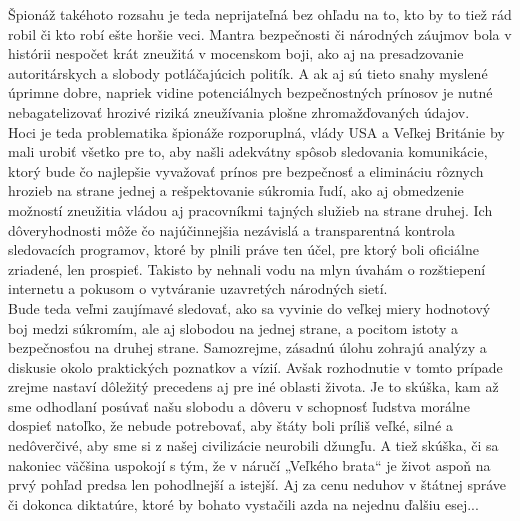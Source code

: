 \documentclass{article}
\begin{document}
\begin{flushleft}
Špionáž takéhoto rozsahu je teda neprijateľná bez ohľadu na to, kto by to tiež rád robil či kto robí ešte horšie veci. Mantra bezpečnosti či národných záujmov bola v histórii nespočet krát zneužitá v mocenskom boji, ako aj na presadzovanie autoritárskych a slobody potláčajúcich politík. A ak aj sú tieto snahy myslené úprimne dobre, napriek vidine potenciálnych bezpečnostných prínosov je nutné nebagatelizovať hrozivé riziká zneužívania plošne zhromažďovaných údajov.\\
Hoci je teda problematika špionáže rozporuplná, vlády USA a Veľkej Británie by mali urobiť všetko pre to, aby našli adekvátny spôsob sledovania komunikácie, ktorý bude čo najlepšie vyvažovať prínos pre bezpečnosť a elimináciu rôznych hrozieb na strane jednej a rešpektovanie súkromia ľudí, ako aj obmedzenie možností zneužitia vládou aj pracovníkmi tajných služieb na strane druhej. Ich dôveryhodnosti môže čo najúčinnejšia nezávislá a transparentná kontrola sledovacích programov, ktoré by plnili práve ten účel, pre ktorý boli oficiálne zriadené, len prospieť. Takisto by nehnali vodu na mlyn úvahám o rozštiepení internetu a pokusom o vytváranie uzavretých národných sietí.\\
Bude teda veľmi zaujímavé sledovať, ako sa vyvinie do veľkej miery hodnotový boj medzi súkromím, ale aj slobodou na jednej strane, a pocitom istoty a bezpečnosťou na druhej strane. Samozrejme, zásadnú úlohu zohrajú analýzy a diskusie okolo praktických poznatkov a vízií. Avšak rozhodnutie v tomto prípade zrejme nastaví dôležitý precedens aj pre iné oblasti života. Je to skúška, kam až sme odhodlaní posúvať našu slobodu a dôveru v schopnosť ľudstva morálne dospieť natoľko, že nebude potrebovať, aby štáty boli príliš veľké, silné a nedôverčivé, aby sme si z našej civilizácie neurobili džungľu. A tiež skúška, či sa nakoniec väčšina uspokojí s tým, že v náručí „Veľkého brata“ je život aspoň na prvý pohľad predsa len pohodlnejší a istejší. Aj za cenu neduhov v štátnej správe či dokonca diktatúre, ktoré by bohato vystačili azda na nejednu ďalšiu esej...
\end{flushleft}
\end{document}
